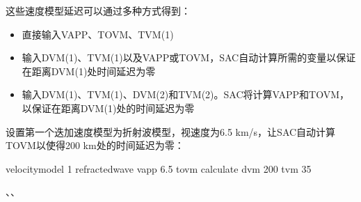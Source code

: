 这些速度模型延迟可以通过多种方式得到：
\begin{itemize}
\item 直接输入VAPP、TOVM、TVM(1)
\item 输入DVM(1)、TVM(1)以及VAPP或TOVM，SAC自动计算所需的变量以保证在距离DVM(1)处时间延迟为零
\item 输入DVM(1)、TVM(1)、DVM(2)和TVM(2)。SAC将计算VAPP和TOVM，以保证在距离DVM(1)处的时间延迟为零
\end{itemize}

设置第一个迭加速度模型为折射波模型，视速度为6.5 km/s，让SAC自动计算TOVM以使得200 km处的时间延迟为零：

\begin{SACCode}
velocitymodel 1 refractedwave vapp 6.5 tovm calculate dvm 200 tvm 35
\end{SACCode}

、、
